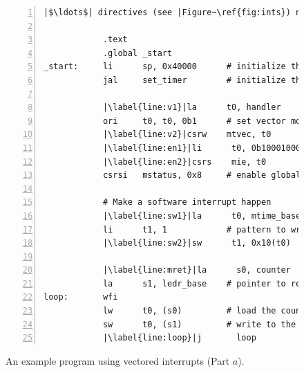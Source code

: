 \documentclass[11pt, twoside, pdftex]{article}
\begin{document}
\begin{figure}[H]
\begin{center}
\begin{minipage}[h]{15 cm}
\begin{lstlisting}[style=defaultNiosVStyle, name=vecs, numbers=left, escapechar=|]
            |$\ldots$| directives (see |Figure~\ref{fig:ints}) not| shown

            .text
            .global _start
_start:     li      sp, 0x40000      # initialize the stack location
            jal     set_timer        # initialize the timer 
     
            |\label{line:v1}|la      t0, handler      # get handler address
            ori     t0, t0, 0b1      # set vector mode
            |\label{line:v2}|csrw    mtvec, t0        # set trap address and mode
            |\label{line:en1}|li      t0, 0b10001000   # set the enable pattern
            |\label{line:en2}|csrs    mie, t0          # timer & software interrupts
            csrsi   mstatus, 0x8     # enable global interrupts

            # Make a software interrupt happen
            |\label{line:sw1}|la      t0, mtime_base   # base address
            li      t1, 1            # pattern to write to msip
            |\label{line:sw2}|sw      t1, 0x10(t0)     # write to msip (sw interrupt)

            |\label{line:mret}|la      s0, counter      # pointer to counter
            la      s1, ledr_base    # pointer to red lights
loop:       wfi
            lw      t0, (s0)         # load the counter value
            sw      t0, (s1)         # write to the lights
            |\label{line:loop}|j       loop
\end{lstlisting}
	\caption{An example program using vectored interrupts (Part $a$).}
	\label{fig:vectored}
\end{minipage}
\end{center}
\end{figure}
\end{document}
